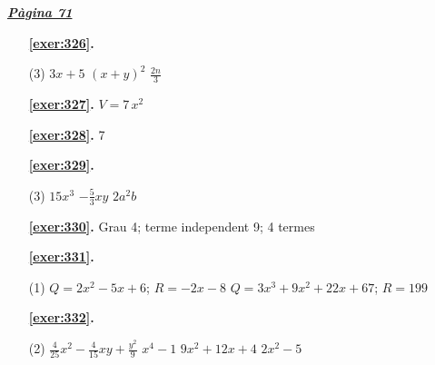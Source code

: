 \hyperlink{page.71}{\textbf{\em Pàgina 71}}
\begin{enumerate}



 \item[\fontfamily{phv}\selectfont\color{blue}\textbf{\ref{exer:326}. }] \label{ans:326}
 \begin{tasks}[column-sep=1em, item-indent=1.3333em](3)
	 \task $3x+5$
	 \task $(x+y)^2$
	 \task $\frac {2n}{3}$
\end{tasks}
 \end{enumerate}
\begin{enumerate}
\item[\fontfamily{phv}\selectfont\color{blue}\textbf{\ref{exer:327}. }] \label{ans:327} 
$V=7\,x^2$
\item[\fontfamily{phv}\selectfont\color{blue}\textbf{\ref{exer:328}. }] \label{ans:328} 
7



 \item[\fontfamily{phv}\selectfont\color{blue}\textbf{\ref{exer:329}. }] \label{ans:329}
 \begin{tasks}[column-sep=1em, item-indent=1.3333em](3)
	 \task $15x^3$
	 \task $-\frac {5}{3}xy$
	 \task $2a^2 b$
\end{tasks}
\item[\fontfamily{phv}\selectfont\color{blue}\textbf{\ref{exer:330}. }] \label{ans:330} 
Grau 4; terme independent 9; 4 termes



 \item[\fontfamily{phv}\selectfont\color{blue}\textbf{\ref{exer:331}. }] \label{ans:331}
 \begin{tasks}[column-sep=1em, item-indent=1.3333em](1)
	 \task $Q=2x^2-5x+6$; $R=-2x-8$
	 \task $Q=3x^3+9x^2+22x+67$; $R=199$
\end{tasks}



 \item[\fontfamily{phv}\selectfont\color{blue}\textbf{\ref{exer:332}. }] \label{ans:332}
 \begin{tasks}[column-sep=1em, item-indent=1.3333em](2)
	 \task* $\frac {4}{25}x^2 - \frac {4}{15}xy + \frac {y^2}{9}$
	 \task $x^4 - 1$
	 \task $9x^2+12x+4$
	 \task $2x^2 -5$
\end{tasks}



\end{enumerate}
